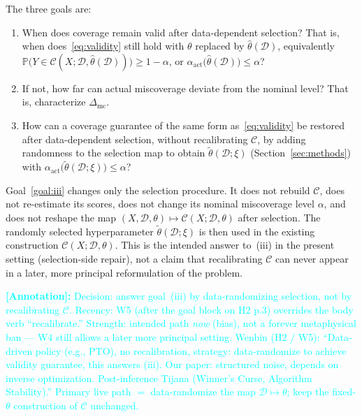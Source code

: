 \documentclass[12pt]{article}
\theoremstyle{plain}
\newcommand{\annote}[1]{\textcolor{cyan}{\textbf{[Annotation]:} #1}}
\begin{document}
The three goals are:
\begin{enumerate}[label=(\roman*),leftmargin=*,ref=(\roman*)]
  \item\label{goal:i}
        When does coverage remain valid after data-dependent selection?
        That is, when does~\eqref{eq:validity} still hold with $\theta$ replaced by $\hat\theta(\mathcal{D})$, equivalently
        $\mathbb{P}\bigl(Y\in\mathcal{C}(X;\mathcal{D},\hat\theta(\mathcal{D}))\bigr)\ge 1-\alpha$,
        or $\alpha_{\mathrm{act}}\bigl(\hat\theta(\mathcal{D})\bigr)\le\alpha$?
  \item\label{goal:ii}
        If not, how far can actual miscoverage deviate from the nominal level?
        That is, characterize $\Delta_{\mathrm{mc}}$.
  \item\label{goal:iii}
        How can a coverage guarantee of the same form as~\eqref{eq:validity} be restored after data-dependent selection,
        without recalibrating $\mathcal{C}$,
        by adding randomness to the selection map to obtain $\widetilde\theta(\mathcal{D};\xi)$
        (Section~\ref{sec:methods}) with $\alpha_{\mathrm{act}}\bigl(\widetilde\theta(\mathcal{D};\xi)\bigr)\le\alpha$?
\end{enumerate}
\label{rem:goal-iii}
Goal~\ref{goal:iii} changes only the selection procedure.
It does not rebuild $\mathcal{C}$, does not re-estimate its scores, does not change its nominal miscoverage level $\alpha$, and does not reshape the map $(X,\mathcal{D},\theta)\mapsto\mathcal{C}(X;\mathcal{D},\theta)$ after selection.
The randomly selected hyperparameter $\widetilde\theta(\mathcal{D};\xi)$ is then used in the existing construction $\mathcal{C}(X;\mathcal{D},\theta)$.
This is the intended answer to~(iii) in the present setting (selection-side repair), not a claim that recalibrating $\mathcal{C}$ can never appear in a later, more principal reformulation of the problem.

\annote{Decision: answer goal~(iii) by data-randomizing selection, not by recalibrating $\mathcal{C}$.
Recency: W5 (after the goal block on H2 p.3) overrides the body verb ``recalibrate.''
Strength: intended path \emph{now} (bias), not a forever metaphysical ban --- W4 still allows a later more principal setting.
Wenbin (H2 / W5): ``Data-driven policy (e.g., PTO), no recalibration, strategy: data-randomize to achieve validity guarantee, this answers (iii). Our paper: structured noise, depends on inverse optimization. Post-inference Tijana (Winner's Curse, Algorithm Stability).''
Primary live path $=$ data-randomize the map $\mathcal{D}\mapsto\theta$; keep the fixed-$\theta$ construction of $\mathcal{C}$ unchanged.}
\end{document}

